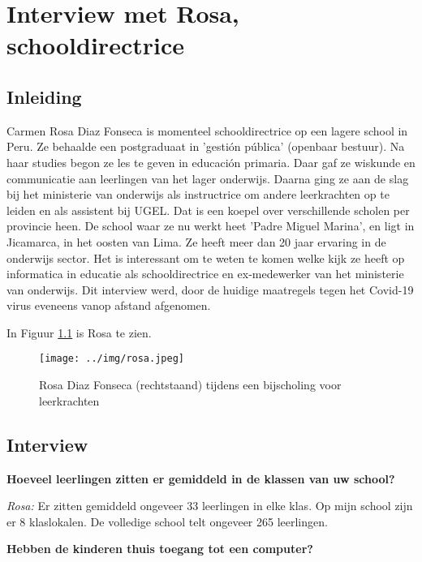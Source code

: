 
\chapter{Interview met Rosa, schooldirectrice}
\label{ch:interviewRosa}

\section{Inleiding}
Carmen Rosa Diaz Fonseca is momenteel schooldirectrice op een lagere school in Peru. Ze behaalde een postgraduaat in 'gestión pública' (openbaar bestuur). Na haar studies begon ze les te geven in educación primaria. Daar gaf ze wiskunde en communicatie aan leerlingen van het lager onderwijs. Daarna ging ze aan de slag bij het ministerie van onderwijs als instructrice om andere leerkrachten op te leiden en als assistent bij UGEL. Dat is een koepel over verschillende scholen per provincie heen. De school waar ze nu werkt heet 'Padre Miguel Marina', en ligt in Jicamarca, in het oosten van Lima. Ze heeft meer dan 20 jaar ervaring in de onderwijs sector. Het is interessant om te weten te komen welke kijk ze heeft op informatica in educatie als schooldirectrice en ex-medewerker van het ministerie van onderwijs. Dit interview werd, door de huidige maatregels tegen het Covid-19 virus eveneens vanop afstand afgenomen.

In Figuur \ref{rosa} is Rosa te zien.

\begin{figure}[h!]
	\texttt{[image: ../img/rosa.jpeg]}
	\caption{Rosa Diaz Fonseca (rechtstaand) tijdens een bijscholing voor leerkrachten }
	\label{rosa}
\end{figure}


\section{Interview}

\textbf{Hoeveel leerlingen zitten er gemiddeld in de klassen van uw school?}

\textit{Rosa:} Er zitten gemiddeld ongeveer 33 leerlingen in elke klas. Op mijn school zijn er 8 klaslokalen. De volledige school telt ongeveer 265 leerlingen.

\textbf{Hebben de kinderen thuis toegang tot een computer?}


